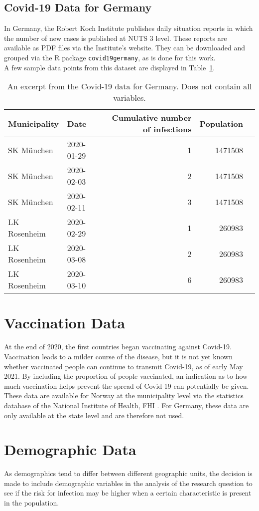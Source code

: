 \subsection{Covid-19 Data for Germany}
In Germany, the Robert Koch Institute publishes daily situation reports in which the number of new cases is published at NUTS 3 level. These reports are available as PDF files via the Institute's website. They can be downloaded and grouped via the R package \texttt{covid19germany}\autocite[][]{covid19germany}, as is done for this work.\\
A few sample data points from this dataset are displayed in Table~\ref{datasetGermany}.
\begin{table}[H] 
\caption{An excerpt from the Covid-19 data for Germany. Does not contain all variables.\label{datasetGermany}}
\begin{tabular}{l l r r r}
\toprule
\textbf{Municipality}	& \textbf{Date}	& \textbf{Cumulative number of infections} & \textbf{Population}\\
\midrule
SK München & 2020-01-29 & 1 & 1471508\\
SK München & 2020-02-03 & 2 & 1471508\\
SK München & 2020-02-11 & 3 & 1471508\\
LK Rosenheim & 2020-02-29 & 1 & 260983\\
LK Rosenheim & 2020-03-08 & 2 & 260983 \\
LK Rosenheim & 2020-03-10 & 6 & 260983 \\
\bottomrule
\end{tabular}
\end{table}
\clearpage
\section{Vaccination Data}
At the end of 2020, the first countries began vaccinating against Covid-19. Vaccination leads to a milder course of the disease, but it is not yet known whether vaccinated people can continue to transmit Covid-19, as of early May 2021. By including the proportion of people vaccinated, an indication as to how much vaccination helps prevent the spread of Covid-19 can potentially be given. These data are available for Norway at the municipality level via the statistics database of the National Institute of Health, FHI \autocite[][]{fhi}. For Germany, these data are only available at the state level and are therefore not used.
\clearpage
\section{Demographic Data}
As demographics tend to differ between different geographic units, the decision is made to include demographic variables in the analysis of the research question to see if the risk for infection may be higher when a certain characteristic is present in the population.
